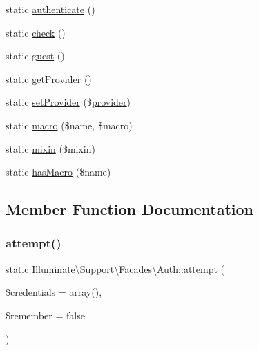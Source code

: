 \begin{DoxyCompactItemize}
\item 
static \mbox{\hyperlink{class_illuminate_1_1_support_1_1_facades_1_1_auth_aa4b00209ad83c9a457af1cf9c0eb98a9}{authenticate}} ()
\item 
static \mbox{\hyperlink{class_illuminate_1_1_support_1_1_facades_1_1_auth_a4d5eba4e6245d756cd3eb807cadd2e2a}{check}} ()
\item 
static \mbox{\hyperlink{class_illuminate_1_1_support_1_1_facades_1_1_auth_a4aef095d6c9b7f60b7b1384d4064eb55}{guest}} ()
\item 
static \mbox{\hyperlink{class_illuminate_1_1_support_1_1_facades_1_1_auth_a0e62552b70450b179a28f6e45d7cb937}{get\+Provider}} ()
\item 
static \mbox{\hyperlink{class_illuminate_1_1_support_1_1_facades_1_1_auth_a8c2ecd65aa1a1607a35519b566bd66da}{set\+Provider}} (\$\mbox{\hyperlink{class_illuminate_1_1_support_1_1_facades_1_1_auth_abf132c9b8d5ccce533211625ec83dc35}{provider}})
\item 
static \mbox{\hyperlink{class_illuminate_1_1_support_1_1_facades_1_1_auth_aa79d00741e5434bcb76731a02ffb361a}{macro}} (\$name, \$macro)
\item 
static \mbox{\hyperlink{class_illuminate_1_1_support_1_1_facades_1_1_auth_a5b3b067862dcf209c346a45f0addcf4d}{mixin}} (\$mixin)
\item 
static \mbox{\hyperlink{class_illuminate_1_1_support_1_1_facades_1_1_auth_a9ec6110e79e885017d5e4d3ad20392e1}{has\+Macro}} (\$name)
\end{DoxyCompactItemize}


\subsection{Member Function Documentation}
\mbox{\label{class_illuminate_1_1_support_1_1_facades_1_1_auth_aaae9451317576aa597277bac1aa2331d}} 
\subsubsection{\texorpdfstring{attempt()}{attempt()}}
{\footnotesize\ttfamily static Illuminate\textbackslash{}\+Support\textbackslash{}\+Facades\textbackslash{}\+Auth\+::attempt (\begin{DoxyParamCaption}\item[{}]{\$credentials = {\ttfamily array()},  }\item[{}]{\$remember = {\ttfamily false} }\end{DoxyParamCaption})\hspace{0.3cm}{\ttfamily [static]}}

